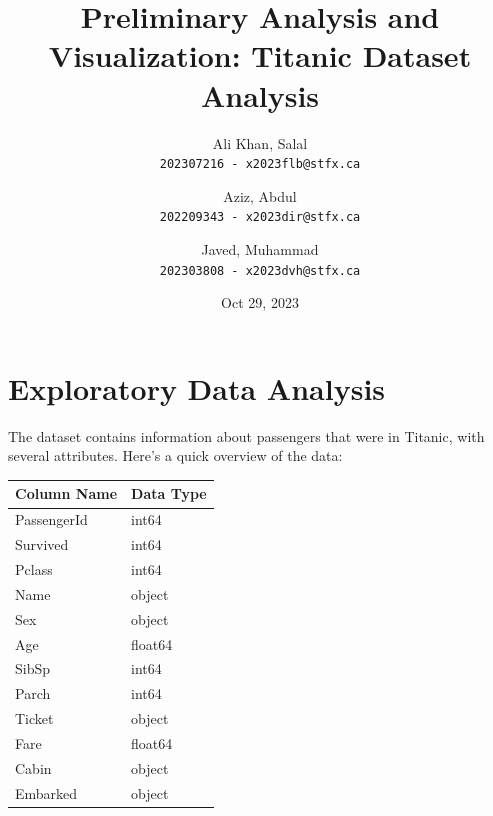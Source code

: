\documentclass[a4paper, 12pt]{article}
\begin{document}
\begin{titlepage}
\title{Preliminary Analysis and Visualization: Titanic Dataset Analysis}
\author{
  Ali Khan, Salal\\
  \texttt{202307216 - x2023flb@stfx.ca}
  \and
  Aziz, Abdul\\
  \texttt{202209343 - x2023dir@stfx.ca}
  \and
  Javed, Muhammad\\
  \texttt{202303808 - x2023dvh@stfx.ca}
}
\date{Oct 29, 2023}
\maketitle
\end{titlepage}

\section*{Exploratory Data Analysis}

\mbox{}

The dataset contains information about passengers that were in Titanic, with several attributes. Here's a quick overview of the data:

\mbox{}

\begin{table}[h]
  \centering
  \begin{tabular}{|l|l|}
    \hline
    \rowcolor[HTML]{EFEFEF}
    \textbf{Column Name} & \textbf{Data Type} \\ \hline
    PassengerId & int64 \\ \hline
    Survived & int64 \\ \hline
    Pclass & int64 \\ \hline
    Name & object \\ \hline
    Sex & object \\ \hline
    Age & float64 \\ \hline
    SibSp & int64 \\ \hline
    Parch & int64 \\ \hline
    Ticket & object \\ \hline
    Fare & float64 \\ \hline
    Cabin & object \\ \hline
    Embarked & object \\ \hline
  \end{tabular}
\end{table}
\end{document}
